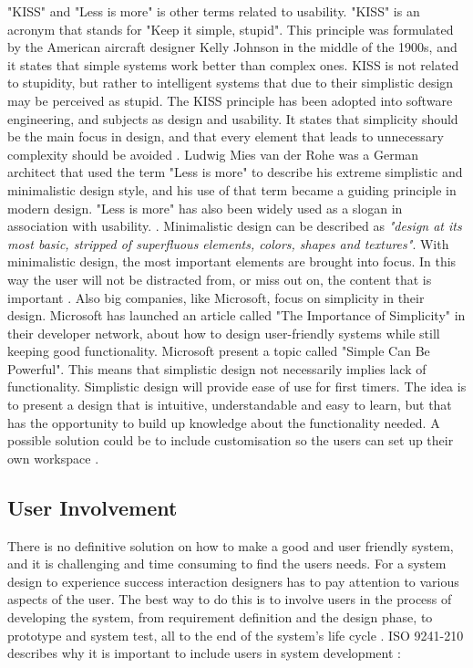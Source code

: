 "KISS" and "Less is more" is other terms related to usability. "KISS" is an acronym that stands for "Keep it simple, stupid". This principle was formulated by the American aircraft designer Kelly Johnson in the middle of the 1900s, and it states that simple systems work better than complex ones. KISS is not related to stupidity, but rather to intelligent systems that due to their simplistic design may be perceived as stupid. The KISS principle has been adopted into software engineering, and subjects as design and usability. It states that simplicity should be the main focus in design, and that every element that leads to unnecessary complexity should be avoided \cite{kiss1} \cite{kiss2}. Ludwig Mies van der Rohe was a German architect that used the term "Less is more" to describe his extreme simplistic and minimalistic design style, and his use of that term became a guiding principle in modern design. "Less is more" has also been widely used as a slogan in association with usability. \cite{rohe}. Minimalistic design can be described as \emph{"design at its most basic, stripped of superfluous elements, colors, shapes and textures"}. With minimalistic design, the most important elements are brought into focus. In this way the user will not be distracted from, or miss out on, the content that is important \cite{lessismore}. Also big companies, like Microsoft, focus on simplicity in their design. Microsoft has launched an article called "The Importance of Simplicity" in their developer network, about how to design user-friendly systems while still keeping good functionality. Microsoft present a topic called "Simple Can Be Powerful". This means that simplistic design not necessarily implies lack of functionality. Simplistic design will provide ease of use for first timers. The idea is to present a design that is intuitive, understandable and easy to learn, but that has the opportunity to build up knowledge about the functionality needed. A possible solution could be to include customisation so the users can set up their own workspace \cite{msdnsimple}.             

\subsection{User Involvement}
There is no definitive solution on how to make a good and user friendly system, and it is challenging and time consuming to find the users needs. For a system design to experience success interaction designers has to pay attention to various aspects of the user. The best way to do this is to involve users in the process of developing the system, from requirement definition and the design phase, to prototype and system test, all to the end of the system's life cycle \cite{mmi}. ISO 9241-210 describes why it is important to include users in system development \cite{dis20109241}:

